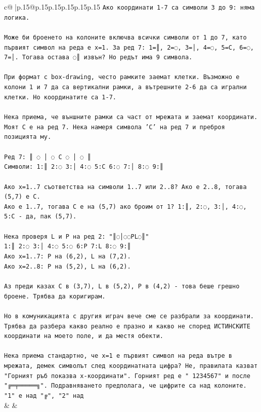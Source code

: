 \documentclass{article}
\begin{document}
{\begin{supertabular}{c@{$\;$}|p{.15\linewidth}@{}p{.15\linewidth}p{.15\linewidth}p{.15\linewidth}p{.15\linewidth}p{.15\linewidth}}
{{{\texttt{Ако координати 1{-}7 са символи 3 до 9: няма логика.} \\
\\ 
\texttt{Може би броенето на колоните включва всички символи от 1 до 7, като първият символ на реда е x=1. За ред 7: 1=║, 2=◌, 3=│, 4=◌, 5=C, 6=◌, 7=│. Тогава остава ◌║ извън? Но редът има 9 символа.} \\
\\ 
\texttt{При формат с box{-}drawing, често рамките заемат клетки. Възможно е колони 1 и 7 да са вертикални рамки, а вътрешните 2{-}6 да са игрални клетки. Но координатите са 1{-}7.} \\
\\ 
\texttt{Нека приема, че външните рамки са част от мрежата и заемат координати. Моят C е на ред 7. Нека намеря символа 'C' на ред 7 и преброя позицията му.} \\
\\ 
\texttt{Ред 7: ║ ◌ │ ◌ C ◌ │ ◌ ║} \\
\texttt{Символи: 1:║ 2:◌ 3:│ 4:◌ 5:C 6:◌ 7:│ 8:◌ 9:║} \\
\\ 
\texttt{Ако x=1..7 съответства на символи 1..7 или 2..8? Ако е 2..8, тогава (5,7) е C.} \\
\texttt{Ако е 1..7, тогава C е на (5,7) ако броим от 1? 1:║, 2:◌, 3:│, 4:◌, 5:C {-} да, пак (5,7).} \\
\\ 
\texttt{Нека проверя L и P на ред 2: "║◌│◌◌PL◌║"} \\
\texttt{1:║ 2:◌ 3:│ 4:◌ 5:◌ 6:P 7:L 8:◌ 9:║} \\
\texttt{Ако x=1..7: P на (6,2), L на (7,2).} \\
\texttt{Ако x=2..8: P на (5,2), L на (6,2).} \\
\\ 
\texttt{Аз преди казах C в (3,7), L в (5,2), P в (4,2) {-} това беше грешно броене. Трябва да коригирам.} \\
\\ 
\texttt{Но в комуникацията с другия играч вече сме се разбрали за координати. Трябва да разбера какво реално е празно и какво не според ИСТИНСКИТЕ координати на моето поле, и да местя обекти.} \\
\\ 
\texttt{Нека приема стандартно, че x=1 е първият символ на реда вътре в мрежата, демек символът след координатната цифра? Не, правилата казват "Горният ръб показва x{-}координати". Горният ред е " 1234567" и после "╔═╤═════╗". Подравняването предполага, че цифрите са над колоните. "1" е над "╔", "2" над} \\
            }
        }
    }
    & & \\ \\


\end{supertabular}}
\end{document}
